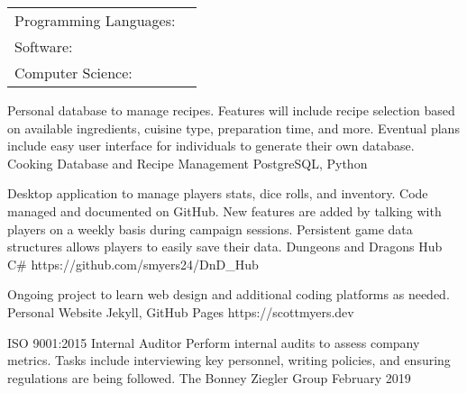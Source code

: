 \documentclass[]{awesome-cv}
\begin{document}
\vspace{-5mm}
	\vspace{-5mm}
\begin{cventries}
	\cventry
	{}
	{\def\arraystretch{1.15}{\begin{tabular}{ l l }
		Programming Languages:  & {\skill{ C\#, Python, C++, Verilog, Java}} \\
		Software:  & {\skill{ Visual Studio, SVN and Git, Windows and Linux, LabVIEW, Eclipse}} \\
		Computer Science:  & {\skill{ Rest API, OOP Principles, Data Structures, Algorithms}} \\
		\end{tabular}}}
	{}
	{}
	{}
\end{cventries}

\vspace{-10mm}
\begin{cventries}
	\cventry
	{Personal database to manage recipes. Features will include recipe selection based on available ingredients, cuisine type, preparation time, and more. Eventual plans include easy user interface for individuals to generate their own database.}
	{Cooking Database and Recipe Management}
	{PostgreSQL, Python}
	{}
	{}
	
	\vspace{-5mm}
	\cventry
	{Desktop application to manage players stats, dice rolls, and inventory. Code managed and documented on GitHub. New features are added by talking with players on a weekly basis during campaign sessions. Persistent game data structures allows players to easily save their data.}
	{Dungeons and Dragons Hub}
	{C\#}
	{https://github.com/smyers24/DnD\_Hub}
	{}
	
	\vspace{-5mm}
	\cventry
	{Ongoing project to learn web design and additional coding platforms as needed.}
	{Personal Website}
	{Jekyll, GitHub Pages}
	{https://scottmyers.dev}
	{}
	
	\vspace{-7mm}
\end{cventries}
\begin{cvhonors}
	\cvhonor
	{ISO 9001:2015 Internal Auditor}
	{Perform internal audits to assess company metrics. Tasks include interviewing key personnel, writing policies, and ensuring regulations are being followed.}
	{The Bonney Ziegler Group}
	{February 2019}
\end{cvhonors}
\ 
\end{document}
